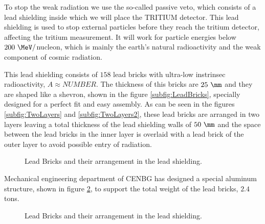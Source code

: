 To stop the weak radiation we use the so-called passive veto, which consists of a lead shielding inside which we will place the TRITIUM detector. This lead shielding is used to stop external particles before they reach the tritium detector, affecting the tritium measurement. It will work for particle energies below $200~\MeV/$nucleon, which is mainly the earth's natural radioactivity and the weak component of cosmic radiation.

This lead shielding consists of $158$ lead bricks with ultra-low instrinsec radioactivity, $A \approx NUMBER$. The thickness of this bricks are $25~\mm$ and they are shaped like a shevron, shown in the figure \ref{subfig:LeadBricks}, specially designed for a perfect fit and easy assembly. As can be seen in the figures \ref{subfig:TwoLayers} and \ref{subfig:TwoLayers2}, these lead bricks are arranged in two layers leaving a total thickness of the lead shielding walls of $50~\mm$ and the space between the lead bricks in the inner layer is overlaid with a lead brick of the outer layer to avoid possible entry of radiation.

\begin{figure}[htbp]
 \centering
 \caption{Lead Bricks and their arrangement in the lead shielding.}
 \label{fig:LeadBricksAndArrangement}
\end{figure}

Mechanical engineering department of CENBG has designed a special aluminum structure, shown in figure \ref{fig:AluminiumStructure}, to support the total weight of the lead bricks, $2.4$ tons.

\begin{figure}[htbp]
 \centering
    \caption{Lead Bricks and their arrangement in the lead shielding.}
 \label{fig:AluminiumStructure}
\end{figure}

